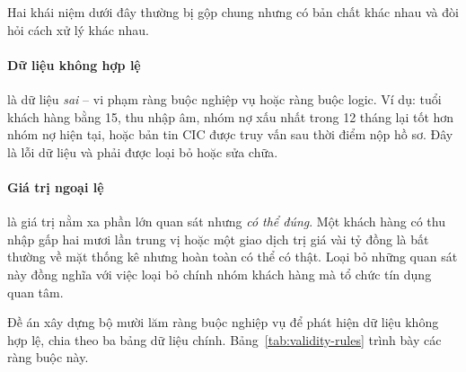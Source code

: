 Hai khái niệm dưới đây thường bị gộp chung nhưng có bản chất khác nhau và đòi
hỏi cách xử lý khác nhau.

\paragraph{Dữ liệu không hợp lệ} là dữ liệu \textit{sai} -- vi phạm ràng buộc
nghiệp vụ hoặc ràng buộc logic. Ví dụ: tuổi khách hàng bằng 15, thu nhập âm, nhóm
nợ xấu nhất trong 12 tháng lại tốt hơn nhóm nợ hiện tại, hoặc bản tin CIC được
truy vấn sau thời điểm nộp hồ sơ. Đây là lỗi dữ liệu và phải được loại bỏ hoặc
sửa chữa.

\paragraph{Giá trị ngoại lệ} là giá trị nằm xa phần lớn quan sát nhưng \textit{có
thể đúng}. Một khách hàng có thu nhập gấp hai mươi lần trung vị hoặc một giao
dịch trị giá vài tỷ đồng là bất thường về mặt thống kê nhưng hoàn toàn có thể có
thật. Loại bỏ những quan sát này đồng nghĩa với việc loại bỏ chính nhóm khách
hàng mà tổ chức tín dụng quan tâm.

Đề án xây dựng bộ mười lăm ràng buộc nghiệp vụ để phát hiện dữ liệu không hợp lệ,
chia theo ba bảng dữ liệu chính. Bảng~\ref{tab:validity-rules} trình bày các ràng
buộc này.

